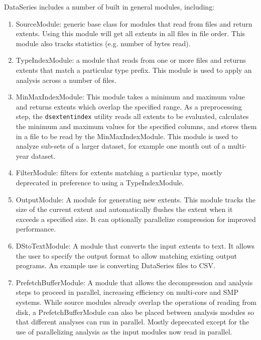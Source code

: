 DataSeries includes a number of built in general modules, including:
\begin{enumerate} 

\item SourceModule: generic base class for modules that read from 
 files and return extents.  Using this module will get all extents 
 in all files in file order.  This module also tracks statistics (e.g. number of bytes read).

  \item TypeIndexModule: a module that reads from one or more files and
returns extents that match a particular type prefix.  This module is used
to apply an analysis across a number of files.

  \item MinMaxIndexModule: This module takes a minimum and maximum
value and returns extents which overlap the specified range.  As a
preprocessing step, the {\tt dsextentindex} utility reads all extents
to be evaluated, calculates the minimum and maximum values for the
specified columns, and stores them in a file to be read by the
MinMaxIndexModule.  This module is used to analyze sub-sets of a larger
dataset, for example one month out of a multi-year dataset.

  \item FilterModule: filters for extents matching a
particular type, mostly deprecated in preference to using a
TypeIndexModule.

  \item OutputModule: A module for generating new extents.  This
module tracks the size of the current extent and automatically flushes
the extent when it exceeds a specified size.  It can optionally parallelize
compression for improved performance.

  \item DStoTextModule: A module that converts the input extents to
text.  It allows the user to specify the output format to allow
matching existing output programs.  An example use is
converting DataSeries files to CSV.

  \item PrefetchBufferModule: A module that allows the decompression
and analysis steps to proceed in parallel, increasing efficiency on
multi-core and SMP systems.  While source modules already overlap the
operations of reading from disk, a PrefetchBufferModule can also be
placed between analysis modules so that different analyses can run in
parallel.  Mostly deprecated except for the use of parallelizing
analysis as the input modules now read in parallel.


\end{enumerate}
